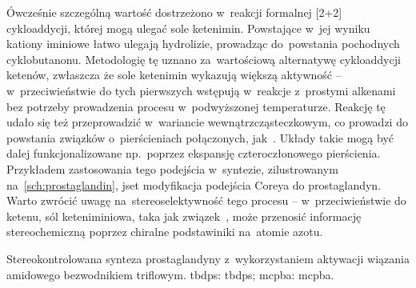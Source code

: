 Ówcześnie szczególną wartość dostrzeżono w~reakcji formalnej [2+2] cykloaddycji, której mogą ulegać sole ketenimin.
Powstające w~jej wyniku kationy iminiowe łatwo ulegają hydrolizie, prowadząc do~powstania pochodnych cyklobutanonu.
Metodologię tę uznano za~wartościową alternatywę cykloaddycji ketenów, zwłaszcza że sole ketenimin wykazują większą aktywność \---
  w~przeciwieństwie do tych pierwszych wstępują w~reakcje z~prostymi alkenami bez potrzeby prowadzenia procesu w~podwyższonej temperaturze\autocite{maulide18}.
Reakcję tę udało się też przeprowadzić w~wariancie wewnątrzcząsteczkowym,
  co prowadzi do powstania związków o~pierścieniach połączonych\autocite{ghosez85}, jak~.
Układy takie mogą być dalej funkcjonalizowane np.~poprzez ekspansję czteroczłonowego pierścienia.
Przykładem zastosowania tego podejścia w~syntezie, zilustrowanym na~\cref{sch:prostaglandin}, jset modyfikacja podejścia Coreya do prostaglandyn\autocite{chen91}.
Warto zwrócić uwagę na~stereoselektywność tego procesu \--- w~przeciwieństwie do ketenu,
  sól keteniminiowa, taka jak związek~, może przenosić informację stereochemiczną poprzez chiralne podstawiniki na~atomie azotu.
\begin{scheme*}
  \centering
  
  \caption{
    Stereokontrolowana synteza prostaglandyny z~wykorzystaniem aktywacji wiązania amidowego bezwodnikiem triflowym.
    \acrshort{tbdps}: \acrlong{tbdps}; \acrshort{mcpba}: \acrlong{mcpba}.
  }
  \label{sch:prostaglandin}
\end{scheme*}

